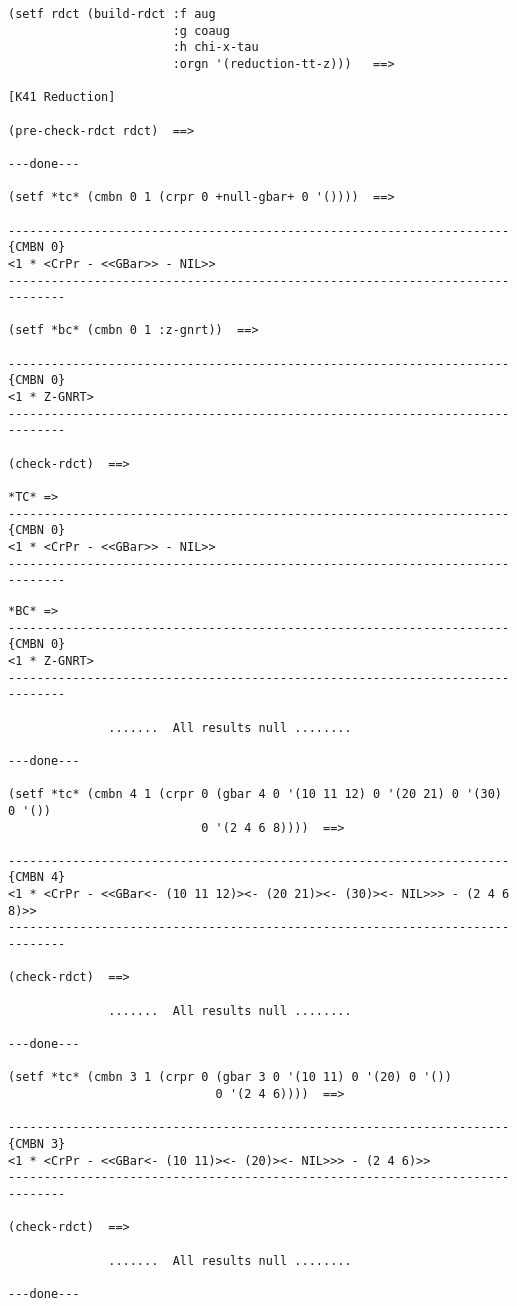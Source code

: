 {\footnotesize\begin{verbatim}
(setf rdct (build-rdct :f aug
                       :g coaug
                       :h chi-x-tau
                       :orgn '(reduction-tt-z)))   ==>

[K41 Reduction]

(pre-check-rdct rdct)  ==>

---done---

(setf *tc* (cmbn 0 1 (crpr 0 +null-gbar+ 0 '())))  ==>

----------------------------------------------------------------------{CMBN 0}
<1 * <CrPr - <<GBar>> - NIL>>
------------------------------------------------------------------------------

(setf *bc* (cmbn 0 1 :z-gnrt))  ==>

----------------------------------------------------------------------{CMBN 0}
<1 * Z-GNRT>
------------------------------------------------------------------------------

(check-rdct)  ==>

*TC* =>
----------------------------------------------------------------------{CMBN 0}
<1 * <CrPr - <<GBar>> - NIL>>
------------------------------------------------------------------------------
\end{verbatim}}
\newpage
{\footnotesize\begin{verbatim}
*BC* =>
----------------------------------------------------------------------{CMBN 0}
<1 * Z-GNRT>
------------------------------------------------------------------------------

              .......  All results null ........

---done---

(setf *tc* (cmbn 4 1 (crpr 0 (gbar 4 0 '(10 11 12) 0 '(20 21) 0 '(30) 0 '())
                           0 '(2 4 6 8))))  ==>

----------------------------------------------------------------------{CMBN 4}
<1 * <CrPr - <<GBar<- (10 11 12)><- (20 21)><- (30)><- NIL>>> - (2 4 6 8)>>
------------------------------------------------------------------------------

(check-rdct)  ==>

              .......  All results null ........

---done---

(setf *tc* (cmbn 3 1 (crpr 0 (gbar 3 0 '(10 11) 0 '(20) 0 '())
                             0 '(2 4 6))))  ==>

----------------------------------------------------------------------{CMBN 3}
<1 * <CrPr - <<GBar<- (10 11)><- (20)><- NIL>>> - (2 4 6)>>
------------------------------------------------------------------------------

(check-rdct)  ==>

              .......  All results null ........

---done---
\end{verbatim}}
